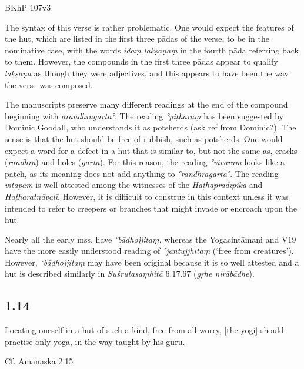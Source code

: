\begin{ekdosis}
\begin{testimonia}[hp01_013]
BKhP 107v3
\end{testimonia}

\begin{philcomm}[hp01_013]  
The syntax of this verse is rather problematic. One would expect the features of the hut, which are listed in the first three pādas of the verse, to be in the nominative case, with the words \emph{idaṃ lakṣaṇaṃ} in the fourth pāda referring back to them. However, the compounds in the first three pādas appear to qualify \emph{lakṣaṇa} as though they were adjectives, and this appears to have been the way the verse was composed.     

The manuscripts preserve many different readings at the end of the compound beginning with \emph{arandhragarta°}. The reading \emph{°piṭharaṃ} has been suggested by Dominic Goodall, who understands it as potsherds (ask ref from Dominic?). The sense is that the hut should be free of rubbish, such as potsherds. One would expect a word for a defect in a hut that is similar to, but not the same as, cracks (\emph{randhra}) and holes (\emph{garta}). For this reason, the reading \emph{°vivaraṃ} looks like a patch, as its meaning does not add anything to \emph{°randhragarta°}. The reading \emph{viṭapaṃ} is well attested among the witnesses of the \emph{Haṭhapradīpikā} and \emph{Haṭharatnāvalī}. However, it is difficult to construe in this context unless it was intended to refer to creepers or branches that might invade or encroach upon the hut.

Nearly all the early mss. have \emph{°bādhojjitaṃ}, whereas the Yogacintāmaṇi and V19 have the more easily understood reading of \emph{°jantūjjhitaṃ} (‘free from creatures’). However, \emph{°bādhojjitaṃ} may have been original because it is so well attested and a hut is described similarly in \emph{Suśrutasaṃhitā} 6.17.67 (\emph{gṛhe nirābādhe}).
\end{philcomm}

\subsection*{1.14}
\begin{translation}[hp01_014]
Locating oneself in a hut of such a kind, free from all worry, [the yogi] should practise only yoga, in the way taught by his guru.
\end{translation}

\begin{sources}[hp01_014]
Cf. Amanaska 2.15


\end{sources}
\end{ekdosis}
